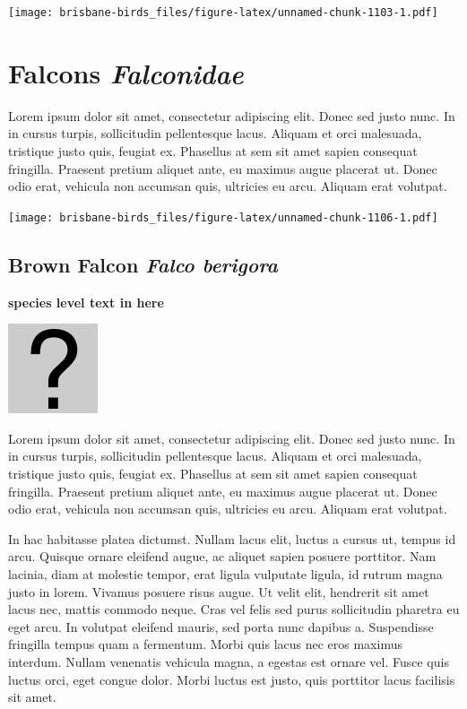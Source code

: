 \documentclass[]{book}
\let\origfigure\figure
\let\endorigfigure\endfigure
\renewenvironment{figure}[1][2] {
  \expandafter\origfigure\expandafter[H]
} {
  \endorigfigure
}
\begin{document}
\begin{figure}
\centering
\texttt{[image: brisbane-birds\_files/figure-latex/unnamed-chunk-1103-1.pdf]}
\caption{\label{fig:unnamed-chunk-1103}insert figure caption}
\end{figure}

\chapter{\texorpdfstring{Falcons
\emph{Falconidae}}{Falcons Falconidae}}\label{falcons-falconidae}

Lorem ipsum dolor sit amet, consectetur adipiscing elit. Donec sed justo
nunc. In in cursus turpis, sollicitudin pellentesque lacus. Aliquam et
orci malesuada, tristique justo quis, feugiat ex. Phasellus at sem sit
amet sapien consequat fringilla. Praesent pretium aliquet ante, eu
maximus augue placerat ut. Donec odio erat, vehicula non accumsan quis,
ultricies eu arcu. Aliquam erat volutpat.

\texttt{[image: brisbane-birds\_files/figure-latex/unnamed-chunk-1106-1.pdf]}

\section{\texorpdfstring{Brown Falcon \emph{Falco
berigora}}{Brown Falcon Falco berigora}}\label{brown-falcon-falco-berigora}

\textbf{species level text in here}

\begin{figure}
\centering
\includegraphics{assets/missing.png}
\caption{No image for species}
\end{figure}

Lorem ipsum dolor sit amet, consectetur adipiscing elit. Donec sed justo
nunc. In in cursus turpis, sollicitudin pellentesque lacus. Aliquam et
orci malesuada, tristique justo quis, feugiat ex. Phasellus at sem sit
amet sapien consequat fringilla. Praesent pretium aliquet ante, eu
maximus augue placerat ut. Donec odio erat, vehicula non accumsan quis,
ultricies eu arcu. Aliquam erat volutpat.

In hac habitasse platea dictumst. Nullam lacus elit, luctus a cursus ut,
tempus id arcu. Quisque ornare eleifend augue, ac aliquet sapien posuere
porttitor. Nam lacinia, diam at molestie tempor, erat ligula vulputate
ligula, id rutrum magna justo in lorem. Vivamus posuere risus augue. Ut
velit elit, hendrerit sit amet lacus nec, mattis commodo neque. Cras vel
felis sed purus sollicitudin pharetra eu eget arcu. In volutpat eleifend
mauris, sed porta nunc dapibus a. Suspendisse fringilla tempus quam a
fermentum. Morbi quis lacus nec eros maximus interdum. Nullam venenatis
vehicula magna, a egestas est ornare vel. Fusce quis luctus orci, eget
congue dolor. Morbi luctus est justo, quis porttitor lacus facilisis sit
amet.
\end{document}

